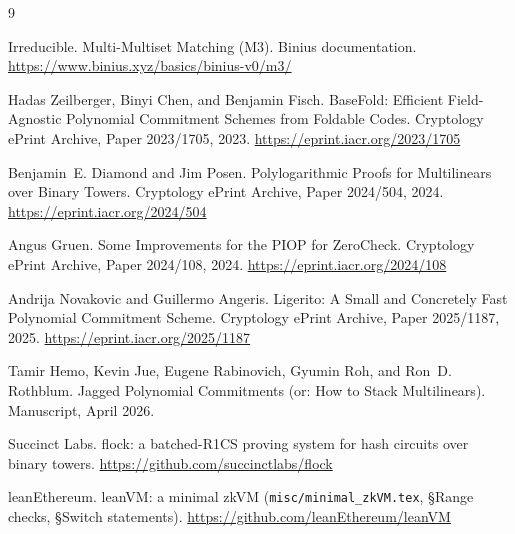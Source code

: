 \documentclass[11pt]{article}
\begin{document}
\fi %

\begin{thebibliography}{9}

Irreducible.
\newblock Multi-Multiset Matching (M3).
\newblock Binius documentation.
\newblock \url{https://www.binius.xyz/basics/binius-v0/m3/}

Hadas Zeilberger, Binyi Chen, and Benjamin Fisch.
\newblock BaseFold: Efficient Field-Agnostic Polynomial Commitment Schemes from Foldable Codes.
\newblock Cryptology ePrint Archive, Paper 2023/1705, 2023.
\newblock \url{https://eprint.iacr.org/2023/1705}

Benjamin~E. Diamond and Jim Posen.
\newblock Polylogarithmic Proofs for Multilinears over Binary Towers.
\newblock Cryptology ePrint Archive, Paper 2024/504, 2024.
\newblock \url{https://eprint.iacr.org/2024/504}

Angus Gruen.
\newblock Some Improvements for the PIOP for ZeroCheck.
\newblock Cryptology ePrint Archive, Paper 2024/108, 2024.
\newblock \url{https://eprint.iacr.org/2024/108}

Andrija Novakovic and Guillermo Angeris.
\newblock Ligerito: A Small and Concretely Fast Polynomial Commitment Scheme.
\newblock Cryptology ePrint Archive, Paper 2025/1187, 2025.
\newblock \url{https://eprint.iacr.org/2025/1187}

Tamir Hemo, Kevin Jue, Eugene Rabinovich, Gyumin Roh, and Ron~D. Rothblum.
\newblock Jagged Polynomial Commitments (or: How to Stack Multilinears).
\newblock Manuscript, April 2026.

Succinct Labs.
\newblock flock: a batched-R1CS proving system for hash circuits over binary towers.
\newblock \url{https://github.com/succinctlabs/flock}

leanEthereum.
\newblock leanVM: a minimal zkVM (\texttt{misc/minimal\_zkVM.tex}, \S Range checks, \S Switch statements).
\newblock \url{https://github.com/leanEthereum/leanVM}

\end{thebibliography}
\end{document}
